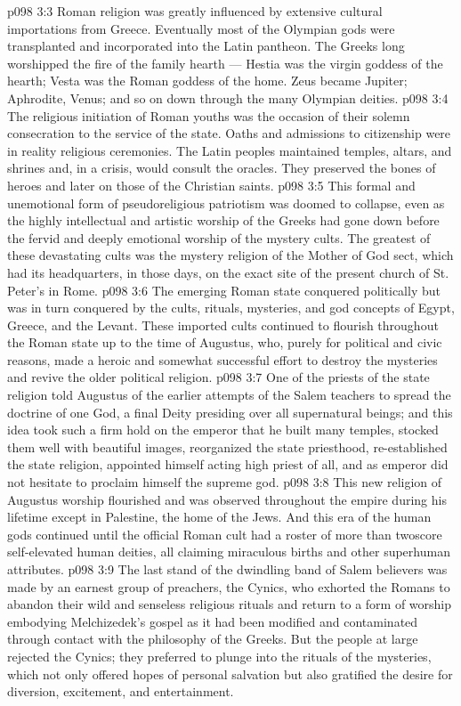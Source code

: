 \vs p098 3:3 Roman religion was greatly influenced by extensive cultural importations from Greece. Eventually most of the Olympian gods were transplanted and incorporated into the Latin pantheon. The Greeks long worshipped the fire of the family hearth --- Hestia was the virgin goddess of the hearth; Vesta was the Roman goddess of the home. Zeus became Jupiter; Aphrodite, Venus; and so on down through the many Olympian deities.
\vs p098 3:4 The religious initiation of Roman youths was the occasion of their solemn consecration to the service of the state. Oaths and admissions to citizenship were in reality religious ceremonies. The Latin peoples maintained temples, altars, and shrines and, in a crisis, would consult the oracles. They preserved the bones of heroes and later on those of the Christian saints.
\vs p098 3:5 This formal and unemotional form of pseudoreligious patriotism was doomed to collapse, even as the highly intellectual and artistic worship of the Greeks had gone down before the fervid and deeply emotional worship of the mystery cults. The greatest of these devastating cults was the mystery religion of the Mother of God sect, which had its headquarters, in those days, on the exact site of the present church of St. Peter’s in Rome.
\vs p098 3:6 \pc The emerging Roman state conquered politically but was in turn conquered by the cults, rituals, mysteries, and god concepts of Egypt, Greece, and the Levant. These imported cults continued to flourish throughout the Roman state up to the time of Augustus, who, purely for political and civic reasons, made a heroic and somewhat successful effort to destroy the mysteries and revive the older political religion.
\vs p098 3:7 One of the priests of the state religion told Augustus of the earlier attempts of the Salem teachers to spread the doctrine of one God, a final Deity presiding over all supernatural beings; and this idea took such a firm hold on the emperor that he built many temples, stocked them well with beautiful images, reorganized the state priesthood, re\hyp{}established the state religion, appointed himself acting high priest of all, and as emperor did not hesitate to proclaim himself the supreme god.
\vs p098 3:8 This new religion of Augustus worship flourished and was observed throughout the empire during his lifetime except in Palestine, the home of the Jews. And this era of the human gods continued until the official Roman cult had a roster of more than twoscore self\hyp{}elevated human deities, all claiming miraculous births and other superhuman attributes.
\vs p098 3:9 \pc The last stand of the dwindling band of Salem believers was made by an earnest group of preachers, the Cynics, who exhorted the Romans to abandon their wild and senseless religious rituals and return to a form of worship embodying Melchizedek’s gospel as it had been modified and contaminated through contact with the philosophy of the Greeks. But the people at large rejected the Cynics; they preferred to plunge into the rituals of the mysteries, which not only offered hopes of personal salvation but also gratified the desire for diversion, excitement, and entertainment.
